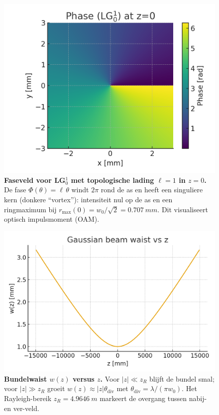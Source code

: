 \documentclass[aps,prb,preprint,amsmath,amssymb]{revtex4-2} %
\begin{document}
    \begin{figure}[h!]
        \centering
        \includegraphics[width=0.78\linewidth]{lg_phase_l1.png}
        \caption{\textbf{Faseveld voor LG$_0^{1}$ met topologische lading $\ell{=}1$ in $z{=}0$.}
        De fase $\Phi(\theta)=\ell\,\theta$ windt $2\pi$ rond de as en heeft een singuliere kern
            (donkere ``vortex''): intensiteit nul op de as en een ringmaximum bij
            $r_{\max}(0)=w_0/\sqrt{2}=\SI{0.707}{mm}$. Dit visualiseert optisch impulsmoment (OAM).}
        \label{fig:lgphase}
    \end{figure}

    \begin{figure}[h!]
        \centering
        \includegraphics[width=0.78\linewidth]{beam_waist_vs_z.png}
        \caption{\textbf{Bundelwaist $w(z)$ versus $z$.}
        Voor $|z|\ll z_R$ blijft de bundel smal; voor $|z|\gg z_R$ groeit $w(z)\approx |z|\theta_{\mathrm{div}}$
            met $\theta_{\mathrm{div}}=\lambda/(\pi w_0)$. Het Rayleigh-bereik $z_R=\SI{4.9646}{m}$
            markeert de overgang tussen nabij- en ver-veld.}
        \label{fig:waist}
    \end{figure}
\end{document}
